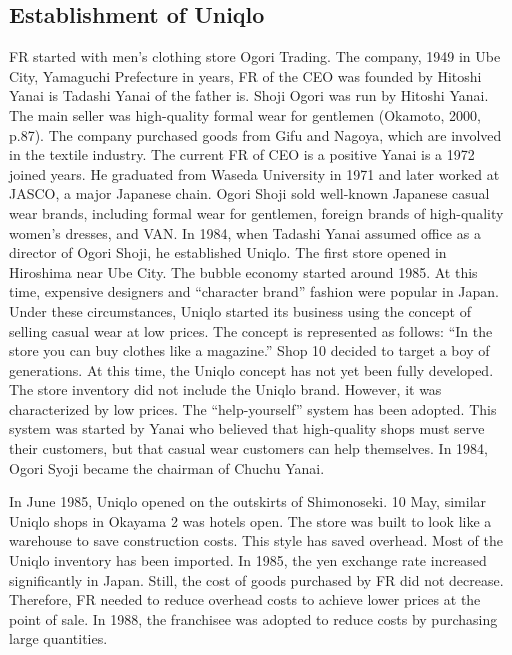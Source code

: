 \documentclass[12pt,a4paper]{article}
\begin{document}
\hypertarget{establishment-of-uniqlo}{%
\subsection{Establishment of Uniqlo}\label{establishment-of-uniqlo}}

FR started with men's clothing store Ogori Trading. The company, 1949 in
Ube City, Yamaguchi Prefecture in years, FR of the CEO was founded by
Hitoshi Yanai is Tadashi Yanai of the father is. Shoji Ogori was run by
Hitoshi Yanai. The main seller was high-quality formal wear for
gentlemen (Okamoto, 2000, p.87). The company purchased goods from Gifu
and Nagoya, which are involved in the textile industry. The current FR
of CEO is a positive Yanai is a 1972 joined years. He graduated from
Waseda University in 1971 and later worked at JASCO, a major Japanese
chain. Ogori Shoji sold well-known Japanese casual wear brands,
including formal wear for gentlemen, foreign brands of high-quality
women's dresses, and VAN. In 1984, when Tadashi Yanai assumed office as
a director of Ogori Shoji, he established Uniqlo. The first store opened
in Hiroshima near Ube City. The bubble economy started around 1985. At
this time, expensive designers and ``character brand'' fashion were
popular in Japan. Under these circumstances, Uniqlo started its business
using the concept of selling casual wear at low prices. The concept is
represented as follows: ``In the store you can buy clothes like a
magazine.'' Shop 10 decided to target a boy of generations. At this
time, the Uniqlo concept has not yet been fully developed. The store
inventory did not include the Uniqlo brand. However, it was
characterized by low prices. The ``help-yourself'' system has been
adopted. This system was started by Yanai who believed that high-quality
shops must serve their customers, but that casual wear customers can
help themselves. In 1984, Ogori Syoji became the chairman of Chuchu
Yanai.

In June 1985, Uniqlo opened on the outskirts of Shimonoseki. 10 May,
similar Uniqlo shops in Okayama 2 was hotels open. The store was built
to look like a warehouse to save construction costs. This style has
saved overhead. Most of the Uniqlo inventory has been imported. In 1985,
the yen exchange rate increased significantly in Japan. Still, the cost
of goods purchased by FR did not decrease. Therefore, FR needed to
reduce overhead costs to achieve lower prices at the point of sale. In
1988, the franchisee was adopted to reduce costs by purchasing large
quantities.
\end{document}
